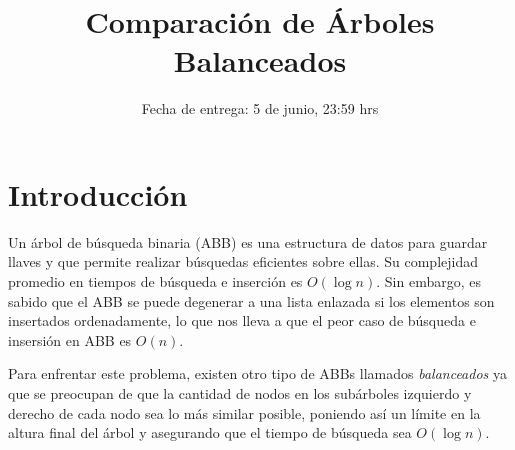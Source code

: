\documentclass[dcc, usedate]{fcfmcourse}
\title[5]{Comparación de Árboles Balanceados}
\date{Fecha de entrega: 5 de junio, 23:59 hrs}
\begin{document}
\maketitle

\section{Introducción}
Un árbol de búsqueda binaria (ABB) es una estructura de datos para guardar llaves y que permite realizar búsquedas eficientes sobre ellas. Su complejidad promedio en tiempos de búsqueda e inserción es $O(\log n)$. Sin embargo, es sabido que el ABB se puede degenerar a una lista enlazada si los elementos son insertados ordenadamente, lo que nos lleva a que el peor caso de búsqueda e insersión en ABB es $O(n)$.

Para enfrentar este problema, existen otro tipo de ABBs llamados \textit{balanceados} ya que se preocupan de que la cantidad de nodos en los subárboles izquierdo y derecho de cada nodo sea lo más similar posible, poniendo así un límite en la altura final del árbol y asegurando que el tiempo de búsqueda sea $O(\log n)$.
\end{document}
